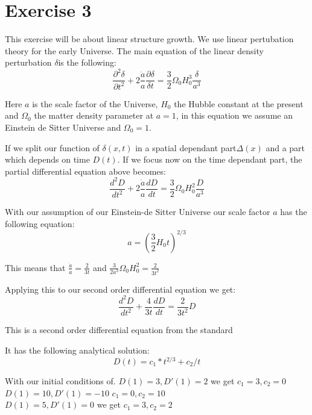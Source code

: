 \section{Exercise 3}
This exercise will be about linear structure growth. We use linear pertubation theory for the early Universe. The main equation of the linear density perturbation $\delta $is the following:
\begin{equation}
\frac{\partial^2\delta}{\partial t^2}+2\frac{\dot{a}}{a}\frac{\partial\delta}{\delta t}=\frac{3}{2}\Omega_0H_0^3\frac{\delta}{a^3}
\end{equation}

Here $a$ is the scale factor of the Universe, $H_0$ the Hubble constant at the present and $\Omega_0$ the matter density parameter at $a=1$, in this equation we assume an Einstein de Sitter Universe and $\Omega_0=1$.

If we split our function of $\delta(x,t)$ in a spatial dependant part$\Delta(x)$ and a part which depends on time $D(t)$. If we focus now on the time dependant part, the partial differential equation above becomes:
\begin{equation}
\frac{d^2 D}{dt^2}+2\frac{\dot{a}}{a}\frac{dD}{d t}=\frac{3}{2}\Omega_0H_0^2\frac{D}{a^3}
\end{equation}

With our assumption of our Einstein-de Sitter Universe our scale factor $a$ has the following equation:
\begin{equation}
a=\left(\frac{3}{2}H_0t\right)^{2/3}
\end{equation}

This means that $\frac{\dot{a}}{a}=\frac{2}{3t}$ and $\frac{3}{2a^3}\Omega_0H_0^2=\frac{2}{3t^2}$

Applying this to our second order differential equation we get:
\begin{equation}
\frac{d^2 D}{dt^2}+\frac{4}{3t}\frac{dD}{d t}=\frac{2}{3t^2} D
\end{equation}

This is a second order differential equation from the standard 

It has the following analytical solution:
\begin{equation}
D(t)=c_1*t^{2/3}+c_2/t
\end{equation}

With our initial conditions of.
$D(1)=3,D'(1)=2$ we get $c_1=3,c_2=0$\\
$D(1)=10,D'(1)=-10$ $c_1=0,c_2=10$\\
$D(1)=5,D'(1)=0$ we get $c_1=3,c_2=2$

